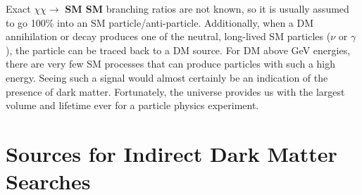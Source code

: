 Exact $\chi\chi \rightarrow$ \textbf{SM SM} branching ratios are not known, so it is usually assumed to go 100\% into an SM particle/anti-particle.
Additionally, when a DM annihilation or decay produces one of the neutral, long-lived SM particles ($\nu$ or $\gamma$), the particle can be traced back to a DM source.
For DM above GeV energies, there are very few SM processes that can produce particles with such a high energy.
Seeing such a signal would almost certainly be an indication of the presence of dark matter.
Fortunately, the universe  provides us with the largest volume and lifetime ever for a particle physics experiment.

\section{Sources for Indirect Dark Matter Searches\label{sec:dm_targets}}

\begin{figure}
\end{figure}

